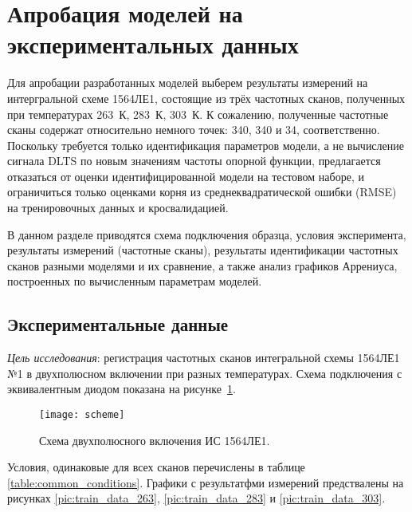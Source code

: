 \section{Апробация моделей на экспериментальных данных}
	Для апробации разработанных моделей выберем результаты измерений на интергральной 
	схеме 1564ЛЕ1, состоящие из трёх частотных сканов, полученных при температурах 
	263~К, 283~К, 303~К. К сожалению, полученные частотные сканы содержат относительно 
	немного точек: 340, 340 и 34, соответственно. Поскольку требуется только 
	идентификация параметров модели, а не вычисление сигнала DLTS по новым значениям 
	частоты опорной функции, предлагается отказаться от оценки идентифицированной 
	модели на тестовом наборе, и ограничиться только оценками корня из 
	среднеквадратической ошибки (RMSE) на тренировочных данных и кросвалидацией.

	В данном разделе приводятся схема подключения образца, условия эксперимента,
	результаты измерений (частотные сканы), результаты идентификации частотных сканов
	разными моделями и их сравнение, а также анализ графиков Аррениуса, построенных 
	по вычисленным параметрам моделей.

	\subsection{Экспериментальные данные}
	\emph{Цель исследования}: регистрация частотных сканов интегральной схемы
	1564ЛЕ1 №1 в двухполюсном включении при разных температурах. Схема 
	подключения с эквивалентным диодом показана на рисунке~\ref{pic:scheme}. 

	\begin{figure}[!ht]
		\centering
		\texttt{[image: scheme]}
		\caption{Схема двухполюсного включения ИС 1564ЛЕ1.}
		\label{pic:scheme}
	\end{figure}

	Условия, одинаковые для всех сканов перечислены в таблице 
	\ref{table:common_conditions}. Графики с результатфми измерений 
	предствалены на рисунках \ref{pic:train_data_263}, \ref{pic:train_data_283}
	и \ref{pic:train_data_303}.

